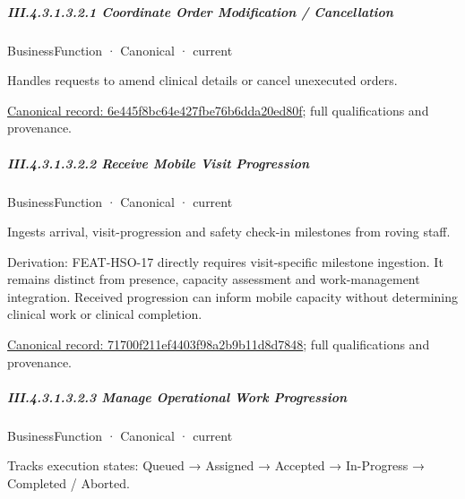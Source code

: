 \subparagraph*{III.4.3.1.3.2.1 Coordinate Order Modification / Cancellation}
\label{navigation:III.4.3.1.3.2.1}

\label{element:6e445f8bc64e427fbe76b6dda20ed80f}
{\small BusinessFunction · Canonical · current}\par

Handles requests to amend clinical details or cancel unexecuted orders.


{\footnotesize \href{../../../../continuum/business/business-function/6e445f8bc64e427fbe76b6dda20ed80f.md}{Canonical record: 6e445f8bc64e427fbe76b6dda20ed80f}; full qualifications and provenance.}\par
\subparagraph*{III.4.3.1.3.2.2 Receive Mobile Visit Progression}
\label{navigation:III.4.3.1.3.2.2}

\label{element:71700f211ef4403f98a2b9b11d8d7848}
{\small BusinessFunction · Canonical · current}\par

Ingests arrival, visit-progression and safety check-in milestones from roving staff.



Derivation: FEAT-HSO-17 directly requires visit-specific milestone ingestion. It remains distinct from presence, capacity assessment and work-management integration. Received progression can inform mobile capacity without determining clinical work or clinical completion.


{\footnotesize \href{../../../../continuum/business/business-function/71700f211ef4403f98a2b9b11d8d7848.md}{Canonical record: 71700f211ef4403f98a2b9b11d8d7848}; full qualifications and provenance.}\par
\subparagraph*{III.4.3.1.3.2.3 Manage Operational Work Progression}
\label{navigation:III.4.3.1.3.2.3}

\label{element:ebc35951617a4f92863922b74dd1c1f4}
{\small BusinessFunction · Canonical · current}\par

Tracks execution states: Queued → Assigned → Accepted → In-Progress → Completed / Aborted.


